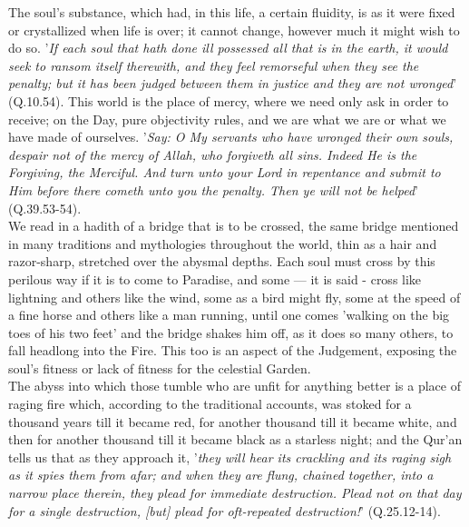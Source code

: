 \documentclass[11pt, b5paper, twoside]{book}
\begin{document}
The soul's substance, which had, in this life, a certain fluidity, is as it were fixed or 
crystallized when life is over; it cannot change, however much it might wish to do so. '\emph{If each soul 
that hath done ill possessed all that is in the earth, it would seek to ransom itself therewith, and 
they feel remorseful when they see the penalty; but it has been judged between them in justice and 
they are not wronged}' (Q.10.54). This world is the place of mercy, where we need only ask in order to 
receive; on the Day, pure objectivity rules, and we are what we are or what we have made of 
ourselves. '\emph{Say: O My servants who have wronged their own souls, despair not of the mercy of Allah, 
who forgiveth all sins. Indeed He is the Forgiving, the Merciful. And turn unto your Lord in 
repentance and submit to Him before there cometh unto you the penalty. Then ye will not be 
helped}' (Q.39.53-54). \\

We read in a hadith of a bridge that is to be crossed, the same bridge mentioned in many traditions 
and mythologies throughout the world, thin as a hair and razor-sharp, stretched over the abysmal 
depths. Each soul must cross by this perilous way if it is to come to Paradise, and some --- it is said 
- cross like lightning and others like the wind, some as a bird might fly, some at the speed of a 
fine horse and others like a man running, until one comes 'walking on the big toes of his two feet' 
and the bridge shakes him off, as it does so many others, to fall headlong into the Fire. This too is 
an aspect of the Judgement, exposing the soul's fitness or lack of fitness for the celestial Garden. \\

The abyss into which those tumble who are unfit for anything better is a place of raging fire which, 
according to the traditional accounts, was stoked for a thousand years till it became red, for 
another thousand till it became white, and then for another thousand till it became black as a 
starless night; and the Qur'an tells us that as they approach it, '\emph{they will hear its crackling and 
its raging sigh as it spies them from afar; and when they are flung, chained together, into a narrow 
place therein, they plead for immediate destruction. Plead not on that day for a single destruction, 
[but] plead for oft-repeated destruction!}' (Q.25.12-14). \\
\end{document}
